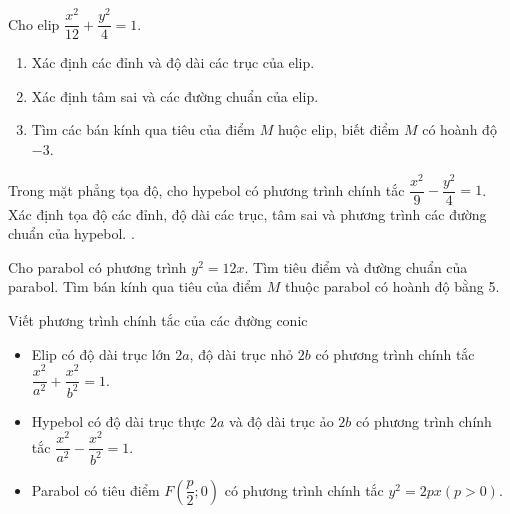 \begin{bt}
	Cho elip $\dfrac{x^2}{12}+\dfrac{y^2}{4}=1.$
	\begin{enumerate}
		\item Xác định các đỉnh và độ dài các trục của elip.
		\item Xác định tâm sai và các đường chuẩn của elip.
		\item Tìm các bán kính qua tiêu của điểm $M$ huộc elip, biết điểm $M$ có hoành độ $-3$.
	\end{enumerate}
\end{bt}
\begin{bt}
	Trong mặt phẳng tọa độ, cho hypebol có phương trình chính tắc $\dfrac{x^2}{9}-\dfrac{y^2}{4}=1$. Xác định tọa độ các đỉnh, độ dài các trục, tâm sai và phương trình các đường chuẩn của hypebol.
	.
\end{bt}
\begin{bt}
	Cho parabol có phương trình $y^2=12x$. Tìm tiêu điểm và đường chuẩn của parabol. Tìm bán kính qua tiêu của điểm $M$ thuộc parabol có hoành độ bằng 5.
\end{bt}
\begin{dang}{Viết phương trình chính tắc của các đường conic}

\begin{itemize}
	\item Elip có độ dài trục lớn $2a$, độ dài trục nhỏ $2b$ có phương trình chính tắc $\dfrac{x^2}{a^2}+\dfrac{x^2}{b^2}=1$.
	\item Hypebol có độ dài trục thực $2a$ và độ dài trục ảo $2b$ có phương trình chính tắc $\dfrac{x^2}{a^2}-\dfrac{x^2}{b^2}=1$.
	\item Parabol có tiêu điểm $F\left( \dfrac{p}{2};0\right) $ có phương trình chính tắc $y^2=2px (p>0)$. 
\end{itemize}
\end{dang}	 

